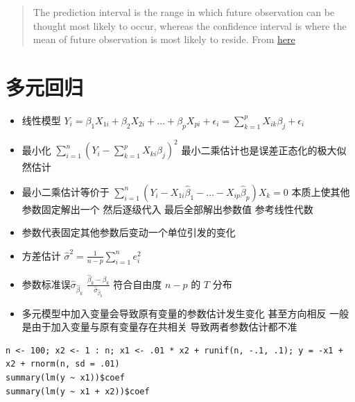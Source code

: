 \documentclass[]{book}
\providecommand{\tightlist}{%
  \setlength{\itemsep}{0pt}\setlength{\parskip}{0pt}}
\begin{document}
\begin{quote}
The prediction interval is the range in which future observation can be thought most likely to occur, whereas the confidence interval is where the mean of future observation is most likely to reside. From \href{http://stackoverflow.com/questions/9406139/r-programming-predict-prediction-vs-confidence/9406534\#9406534}{here}
\end{quote}

\hypertarget{ux591aux5143ux56deux5f52}{%
\section{多元回归}\label{ux591aux5143ux56deux5f52}}

\begin{itemize}
\tightlist
\item
  线性模型 \(Y_i = \beta_1 X_{1i} + \beta_2 X_{2i} + \ldots + \beta_{p} X_{pi} + \epsilon_{i} = \sum_{k=1}^p X_{ik} \beta_j + \epsilon_{i}\)
\item
  最小化 \(\sum_{i=1}^n \left(Y_i - \sum_{k=1}^p X_{ki} \beta_j\right)^2\) 最小二乘估计也是误差正态化的极大似然估计
\item
  最小二乘估计等价于 \(\sum_{i=1}^n (Y_i - X_{1i}\hat \beta_1 - \ldots - X_{ip}\hat \beta_p) X_k = 0\) 本质上使其他参数固定解出一个 然后逐级代入 最后全部解出参数值 参考线性代数
\item
  参数代表固定其他参数后变动一个单位引发的变化
\item
  方差估计 \(\hat \sigma^2 = \frac{1}{n-p} \sum_{i=1}^n e_i ^2\)
\item
  参数标准误\(\hat \sigma_{\hat \beta_k}\) \(\frac{\hat \beta_k - \beta_k}{\hat \sigma_{\hat \beta_k}}\) 符合自由度 \(n-p\) 的 \(T\) 分布
\item
  多元模型中加入变量会导致原有变量的参数估计发生变化 甚至方向相反 一般是由于加入变量与原有变量存在共相关 导致两者参数估计都不准
\end{itemize}

\begin{verbatim}
n <- 100; x2 <- 1 : n; x1 <- .01 * x2 + runif(n, -.1, .1); y = -x1 + x2 + rnorm(n, sd = .01)
summary(lm(y ~ x1))$coef
summary(lm(y ~ x1 + x2))$coef
\end{verbatim}
\end{document}
